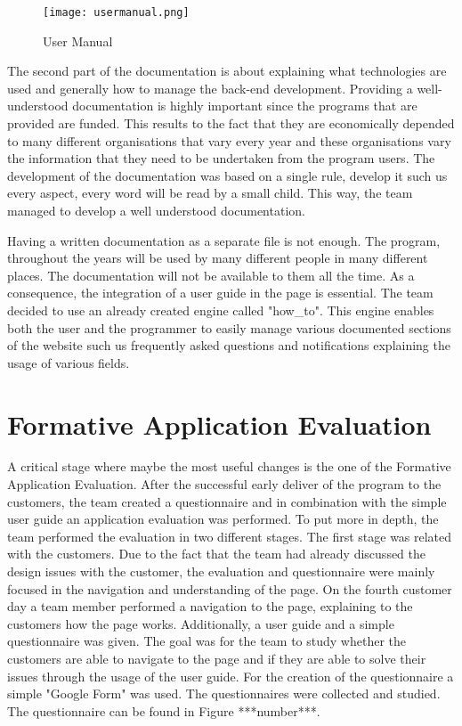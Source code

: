 \documentclass{l3proj}
\begin{document}
\begin{figure}
  \centerline{\texttt{[image: usermanual.png]}}
  \caption{User Manual }
\end{figure}

 The second part of the documentation is about explaining what technologies are used and generally how to manage the back-end development. Providing a well-understood documentation is highly important since the programs that are provided are funded. This results to the fact that they are economically depended to many different organisations that vary every year and these organisations vary the information that they need to be undertaken from the program users. The development of the documentation was based on a single rule, develop it such us every aspect, every word will be read by a small child. This way, the team managed to develop a well understood documentation. 

Having a written documentation as a separate file is not enough. The program, throughout the years will be used by many different people in many different places. The documentation will not be available to them all the time. As a consequence, the integration of a user guide in the page is essential. The team decided to use an already created engine called "how_to". This engine enables both the user and the programmer to easily manage various documented sections of the website such us frequently asked questions and notifications explaining the usage of various fields.


\section{Formative Application Evaluation}
\label{sec:appEval}

A critical stage where maybe the most useful changes is the one of the Formative Application Evaluation. After the successful early deliver of the program to the customers, the team created a questionnaire and in combination with the simple user guide an application evaluation was performed. To put more in depth, the team performed the evaluation in two different stages. The first stage was related with the customers. Due to the fact that the team had already discussed the design issues with the customer, the evaluation and questionnaire were mainly focused in the navigation and understanding of the page. On the  fourth customer day a team member performed a navigation to the page, explaining to the customers how the page works.  Additionally, a user guide and a simple questionnaire was given. The goal was for the team to study whether the customers are able to navigate to the page and if they are able to solve their issues through the usage of the user guide. For the creation of the questionnaire a simple "Google Form" was used. The questionnaires were collected and studied. The questionnaire can be found in Figure ***number***.
\end{document}
